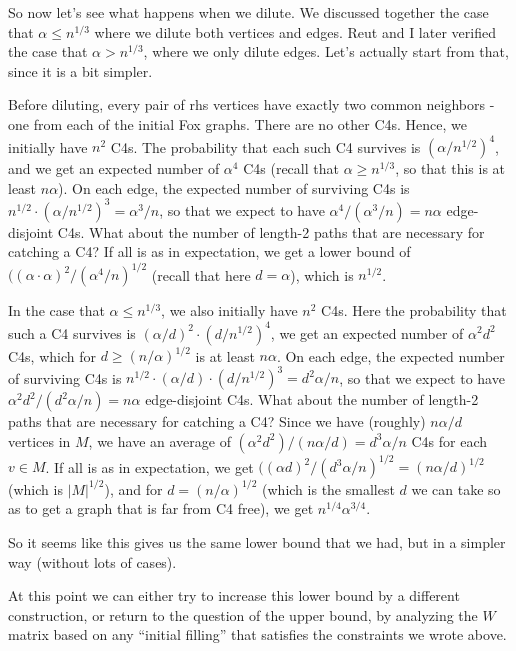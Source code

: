 \documentclass{article}
\begin{document}
So now let's see what happens when we dilute. We discussed together the case that $\alpha \leq n^{1/3}$ where we dilute both vertices and edges. Reut and I later verified the case that $\alpha > n^{1/3}$, where we only dilute edges. Let's actually start from that, since it is a bit simpler.

Before diluting, every pair of rhs vertices have exactly two common neighbors - one from each of the initial Fox graphs. There are no other C4s. Hence, we initially have $n^2$ C4s. The probability that each such C4 survives is $(\alpha/n^{1/2})^4$, and we get an expected number of $\alpha^4$ C4s (recall that $\alpha \geq n^{1/3}$, so that this is at least $n\alpha$). On each edge, the expected number of surviving C4s is $n^{1/2} \cdot (\alpha/n^{1/2})^3 = \alpha^3/n$, so that we expect to have $\alpha^4 / (\alpha^3/n) = n\alpha$ edge-disjoint C4s. What about the number of length-2 paths that are necessary for catching a C4? If all is as in expectation, we get a lower bound of $((\alpha \cdot \alpha)^2 / (\alpha^4 /n)^{1/2}$ (recall that here $d=\alpha$), which is $n^{1/2}$.

In the case that $\alpha \leq n^{1/3}$, we also initially have $n^2$ C4s. Here the probability that such a C4 survives is $(\alpha /d)^2 \cdot (d/n^{1/2})^4$, we get an expected number of $\alpha^2 d^2$ C4s, which for $d \geq (n/\alpha)^{1/2}$ is at least $n\alpha$. On each edge, the expected number of surviving C4s is $n^{1/2} \cdot (\alpha/d)\cdot  (d/n^{1/2})^3 = d^2\alpha/n$, so that we expect to have $\alpha^2 d^2 / (d^2\alpha/n) = n\alpha$ edge-disjoint C4s. What about the number of length-2 paths that are necessary for catching a C4? Since we have (roughly) $n\alpha/d$ vertices in $M$, we have an average of $(\alpha^2 d^2)/(n\alpha /d) = d^3\alpha/n$ C4s for each $v\in M$. If all is as in expectation, we get
$((\alpha d)^2 / (d^3\alpha/n )^{1/2} = (n \alpha /d)^{1/2}$ (which is $|M|^{1/2}$), and for $d = (n/\alpha)^{1/2}$ (which is the smallest $d$ we can take so as to get a graph that is far from C4 free), we get $n^{1/4}\alpha^{3/4}$.

So it seems like this gives us the same lower bound that we had, but in a simpler way (without lots of cases).


At this point we can either try to increase this lower bound by a different construction, or return to the question of the upper bound, by analyzing the $W$ matrix based on any ``initial filling'' that satisfies the constraints we wrote above.

\iffalse
\end{document}
